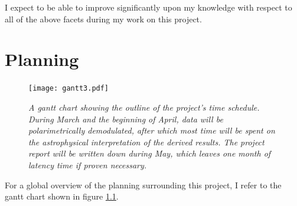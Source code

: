 \documentclass[twoside,single]{lion-msc}
\begin{document}
    I expect to be able to improve significantly upon my knowledge with respect to all of the above facets during my work on this project. 
    
    
    
\chapter{Planning}

    \begin{figure}[h]
      \centering
        \texttt{[image: gantt3.pdf]}
      \caption{\textit{A gantt chart showing the outline of the project's time schedule. During March and the beginning of April, data will be polarimetrically demodulated, after which most time will be spent on the astrophysical interpretation of the derived results. The project report will be written down during May, which leaves one month of latency time if proven necessary.}}
      \label{fig:gantt}
    \end{figure}

    For a global overview of the planning surrounding this project, I refer to the gantt chart shown in figure \ref{fig:gantt}.









%

\renewcommand\refname{}


\end{document}
